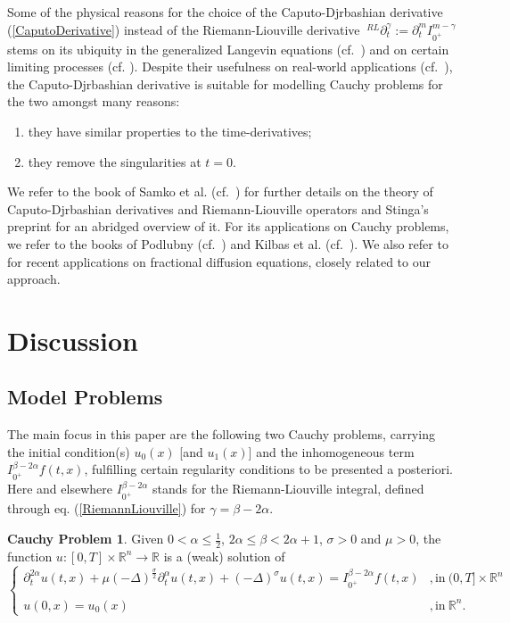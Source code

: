 \documentclass{amsart}
\theoremstyle{definition}
\newtheorem{problem}[theorem]{Cauchy Problem}
\theoremstyle{remark}
\numberwithin{equation}{section}
\newcommand{\BR}{{\mathbb R}}
\begin{document}
Some of the physical reasons for the choice of the Caputo-Djrbashian derivative (\ref{CaputoDerivative}) instead of the Riemann-Liouville derivative ${~}^{RL}\partial_t^\gamma:=\partial_t^mI^{m-\gamma}_{0^+}$ stems on its ubiquity in the generalized Langevin equations (cf.~\cite{LLL17}) and on certain limiting processes (cf. \cite{HairerEtAl18}). Despite their usefulness on real-world applications (cf.~\cite{ABM16,Almeida17}), the Caputo-Djrbashian derivative is suitable for modelling Cauchy problems for the two amongst many reasons:  
\begin{enumerate}
	\item they have similar properties to the time-derivatives;
	\item they remove the singularities at $t=0$.
\end{enumerate}

We refer to the book of Samko et al. (cf.~\cite{samko1993fractional}) for further details on the theory of Caputo-Djrbashian derivatives and Riemann-Liouville operators and Stinga's preprint \cite{Stinga22} for an abridged overview of it. For its applications on Cauchy problems, we refer to the books of Podlubny (cf.~\cite{Podlubny99}) and Kilbas et al. (cf.~\cite{KST06}). We also refer to \cite{KSVZ16,KSZ17,AEP19,LVaz20,DAbbiccoGirardi22} for recent applications on fractional diffusion equations, closely related to our approach.

\section{Discussion}\label{Discussion}

\subsection{Model Problems}

The main focus in this paper are the following two Cauchy problems, carrying the initial condition(s) $u_0(x)$ [and $u_1(x)$] and the inhomogeneous term $I^{\beta-2\alpha}_{0^+}f(t,x)$, fulfilling certain regularity conditions to be presented a posteriori. Here and elsewhere $I^{\beta-2\alpha}_{0^+}$ stands for the Riemann-Liouville integral, defined through eq. (\ref{RiemannLiouville}) for $\gamma=\beta-2\alpha$.

\begin{problem}\label{CP_parabolic}
	Given $0<\alpha\leq \frac{1}{2}$, $2\alpha\leq \beta< 2\alpha+1$, $\sigma>0$ and $\mu>0$, the function $u:[0,T]\times \BR^n\rightarrow \BR$ is a (weak) solution of
	\begin{equation*}
		\begin{cases}
			\displaystyle \partial^{2\alpha}_t u(t,x)+\mu (-\Delta)^{\frac{\sigma}{2}}\partial^\alpha_t u(t,x)+(-\Delta)^\sigma u(t,x)=I^{\beta-2\alpha}_{0^+}f(t,x)&,\mbox{in}~(0,T]\times \mathbb{R}^n\\ \ \\
			u(0,x)=u_0(x)~&,\mbox{in}~\mathbb{R}^n.
		\end{cases}
	\end{equation*}
\end{problem}
\end{document}
